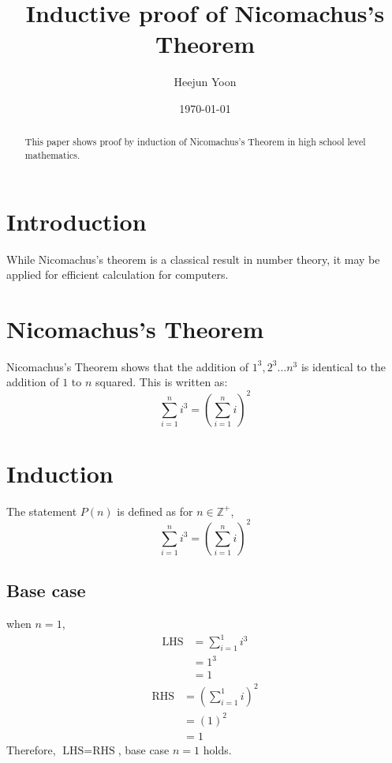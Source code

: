 \documentclass [12pt] {article}
\title{Inductive proof of Nicomachus's Theorem}
\author{Heejun Yoon}
\date{\today}
\begin{document}
\maketitle

\begin{abstract}
    This paper shows proof by induction of Nicomachus's Theorem in high school level mathematics.
\end{abstract}

\tableofcontents
\newpage 

\section{Introduction}
While Nicomachus's theorem is a classical result in number theory, it may be applied for efficient calculation for computers.

\section{Nicomachus's Theorem}
Nicomachus's Theorem shows that the addition of $1^3, 2^3 \dots n^3$ is identical to the addition of $1$ to $n$ squared. This is written as: 
\begin{equation}
    \sum_{i=1}^{n} i^3 = \left(\sum_{i=1}^{n}i\right)^2
\end{equation}

\section{Induction}
The statement $P(n)$ is defined as for $n \in \mathbb{Z}^+$,
\begin{equation}
    \sum_{i=1}^{n} i^3 = \left(\sum_{i=1}^{n}i\right)^2
\end{equation}

\subsection{Base case}
when $n=1$, 
\begin{align*}
    \text{LHS} &=\sum_{i=1}^{1}i^3\\
    &=1^3\\
    &=1
\end{align*}
\begin{align*}
    \text{RHS} &=\left(\sum_{i=1}^{1}i\right)^2\\
    &=(1)^2\\
    &=1
\end{align*}
Therefore, $\text{LHS}=\text{RHS}$, base case $n=1$ holds.
\end{document}
